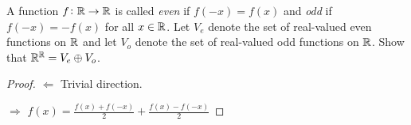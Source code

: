 \documentclass{extarticle}
\begin{document}
\begin{problem}{24}
    A function \(f \colon \mathbb{R} \to \mathbb{R}\) is called \emph{even} if \(f(-x)=f(x)\) and 
    \emph{odd} if \(f(-x) = -f(x)\) for all \(x \in \mathbb{R}\). Let \(V_e\) denote the 
    set of real-valued even functions on \(\mathbb{R}\) and let \(V_o\) denote the 
    set of real-valued odd functions on \(\mathbb{R}\). Show that \(\mathbb{R}^{\mathbb{R}} = V_e \oplus V_o\).
\end{problem}


\begin{proof}
\(\Leftarrow\) Trivial direction. 

\(\Rightarrow\) \(f(x) = \frac{f(x) + f(-x)}{2} + \frac{f(x) - f(-x)}{2}\)
\end{proof}
\end{document}
